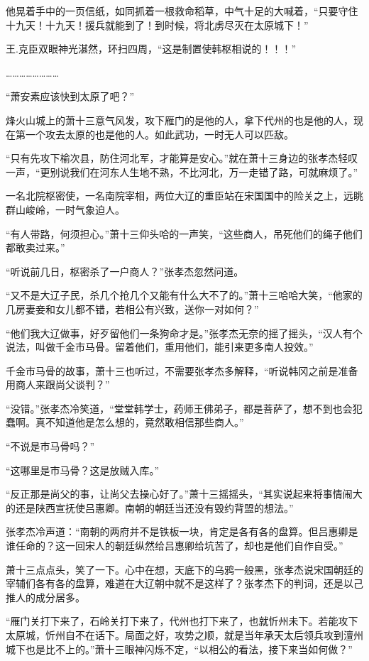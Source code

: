 他晃着手中的一页信纸，如同抓着一根救命稻草，中气十足的大喊着，“只要守住十九天！十九天！援兵就能到了！到时候，将北虏尽灭在太原城下！”

王.克臣双眼神光湛然，环扫四周，“这是制置使韩枢相说的！！！”

……………………

“萧安素应该快到太原了吧？”

烽火山城上的萧十三意气风发，攻下雁门的是他的人，拿下代州的也是他的人，现在第一个攻去太原的也是他的人。如此武功，一时无人可以匹敌。

“只有先攻下榆次县，防住河北军，才能算是安心。”就在萧十三身边的张孝杰轻叹一声，“更别说我们在河东人生地不熟，不比河北，万一走错了路，可就麻烦了。”

一名北院枢密使，一名南院宰相，两位大辽的重臣站在宋国国中的险关之上，远眺群山峻岭，一时气象迫人。

“有人带路，何须担心。”萧十三仰头哈的一声笑，“这些商人，吊死他们的绳子他们都敢卖过来。”

“听说前几日，枢密杀了一户商人？”张孝杰忽然问道。

“又不是大辽子民，杀几个抢几个又能有什么大不了的。”萧十三哈哈大笑，“他家的几房妻妾和女儿都不错，若相公有兴致，送你一对如何？”

“他们我大辽做事，好歹留他们一条狗命才是。”张孝杰无奈的摇了摇头，“汉人有个说法，叫做千金市马骨。留着他们，重用他们，能引来更多南人投效。”

千金市马骨的故事，萧十三也听过，不需要张孝杰多解释，“听说韩冈之前是准备用商人来跟尚父谈判？”

“没错。”张孝杰冷笑道，“堂堂韩学士，药师王佛弟子，都是菩萨了，想不到也会犯蠢啊。真不知道他是怎么想的，竟然敢相信那些商人。”

“不说是市马骨吗？”

“这哪里是市马骨？这是放贼入库。”

“反正那是尚父的事，让尚父去操心好了。”萧十三摇摇头，“其实说起来将事情闹大的还是陕西宣抚使吕惠卿。南朝的朝廷当还没有毁约背盟的想法。”

张孝杰冷声道：“南朝的两府并不是铁板一块，肯定是各有各的盘算。但吕惠卿是谁任命的？这一回宋人的朝廷纵然给吕惠卿给坑苦了，却也是他们自作自受。”

萧十三点点头，笑了一下。心中在想，天底下的乌鸦一般黑，张孝杰说宋国朝廷的宰辅们各有各的盘算，难道在大辽朝中就不是这样了？张孝杰下的判词，还是以己推人的成分居多。

“雁门关打下来了，石岭关打下来了，代州也打下来了，也就忻州未下。若能攻下太原城，忻州自不在话下。局面之好，攻势之顺，就是当年承天太后领兵攻到澶州城下也是比不上的。”萧十三眼神闪烁不定，“以相公的看法，接下来当如何做？”

